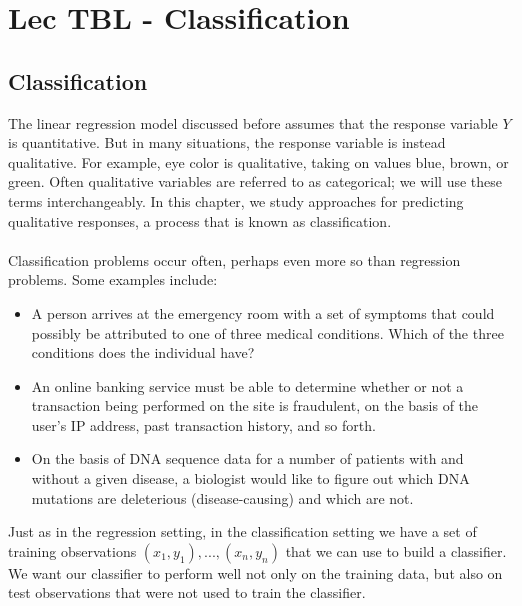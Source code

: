 \chapter{Lec TBL - Classification}

\section{Classification}
The linear regression model discussed before assumes that the response variable $Y$ is quantitative. But in many situations, the response variable is instead qualitative. For example, eye color is qualitative, taking on values blue, brown, or green. Often qualitative variables are referred to as categorical; we will use these terms interchangeably. In this chapter, we study approaches for predicting qualitative responses, a process that is known as classification.\\\\
Classification problems occur often, perhaps even more so than regression
problems. Some examples include:
\begin{itemize}
    \item A person arrives at the emergency room with a set of symptoms
    that could possibly be attributed to one of three medical conditions.
    Which of the three conditions does the individual have?

    \item An online banking service must be able to determine whether or not
    a transaction being performed on the site is fraudulent, on the basis
    of the user’s IP address, past transaction history, and so forth.

    \item On the basis of DNA sequence data for a number of patients with
    and without a given disease, a biologist would like to figure out which
    DNA mutations are deleterious (disease-causing) and which are not.
    
\end{itemize}
Just as in the regression setting, in the classification setting we have a
set of training observations $(x_1, y_1),...,(x_n, y_n)$ that we can use to build
a classifier. We want our classifier to perform well not only on the training
data, but also on test observations that were not used to train the classifier.

